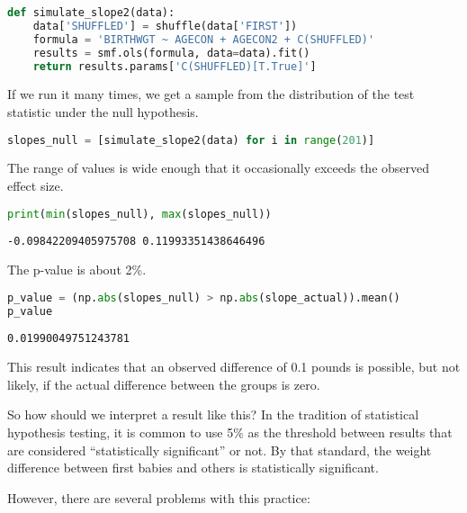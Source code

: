 \pagebreak

\begin{lstlisting}[language=Python,style=source]
def simulate_slope2(data):
    data['SHUFFLED'] = shuffle(data['FIRST'])
    formula = 'BIRTHWGT ~ AGECON + AGECON2 + C(SHUFFLED)'
    results = smf.ols(formula, data=data).fit()
    return results.params['C(SHUFFLED)[T.True]']
\end{lstlisting}

If we run it many times, we get a sample from the distribution of the
test statistic under the null hypothesis.

\begin{lstlisting}[language=Python,style=source]
slopes_null = [simulate_slope2(data) for i in range(201)]
\end{lstlisting}

The range of values is wide enough that it occasionally exceeds the
observed effect size.

\begin{lstlisting}[language=Python,style=source]
print(min(slopes_null), max(slopes_null))
\end{lstlisting}

\begin{lstlisting}[style=output]
-0.09842209405975708 0.11993351438646496
\end{lstlisting}

The p-value is about 2\%.

\begin{lstlisting}[language=Python,style=source]
p_value = (np.abs(slopes_null) > np.abs(slope_actual)).mean()
p_value
\end{lstlisting}

\begin{lstlisting}[style=output]
0.01990049751243781
\end{lstlisting}

This result indicates that an observed difference of 0.1 pounds is
possible, but not likely, if the actual difference between the groups is
zero.

So how should we interpret a result like this? In the tradition of
statistical hypothesis testing, it is common to use 5\% as the threshold
between results that are considered ``statistically significant'' or
not. By that standard, the weight difference between first babies and
others is statistically significant.

However, there are several problems with this practice:

